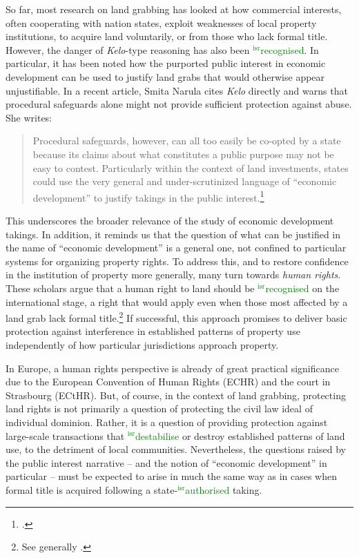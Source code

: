 \documentclass[12pt,a4paper]{book} %
\newcommand{\isr}[1]{\textcolor{green}{$^{\textrm{isr}}${#1}}}
\begin{document}
So far, most research on land grabbing has looked at how commercial interests, often cooperating with nation states, exploit weaknesses of local property institutions, to acquire land voluntarily, or from those who lack formal title. However, the danger of {\it Kelo}-type reasoning has also been \isr{recognised}. In particular, it has been noted how the purported public interest in economic development can be used to justify land grabs that would otherwise appear unjustifiable. In a recent article, Smita Narula cites {\it Kelo} directly and warns that procedural safeguards alone might not provide sufficient protection against abuse. She writes:
\begin{quote}
Procedural safeguards, however, can all too easily be co-opted by a state because its claims about what constitutes a public purpose may not be easy to contest. Particularly within the context of land investments, states could use the very general and under-scrutinized language of ``economic development'' to justify takings in the public interest.\footcite[157]{narula13}
\end{quote}

This underscores the broader relevance of the study of economic development takings. In addition, it reminds us that the question of what can be justified in the name of ``economic development'' is a general one, not confined to particular systems for organizing property rights. To address this, and to restore confidence in the institution of property more generally, many turn towards {\it human rights}. These scholars argue that a human right to land should be \isr{recognised} on the international stage, a right that would apply even when those most affected by a land grab lack formal title.\footnote{See generally \cite{schutter10,schutter11,kunnerman13}.} If successful, this approach promises to deliver basic protection against interference in established patterns of property use independently of how particular jurisdictions approach property.

In Europe, a human rights perspective is already of great practical significance due to the European Convention of Human Rights (ECHR) and the court in Strasbourg (ECtHR). But, of course, in the context of land grabbing, protecting land rights is not primarily a question of protecting the civil law ideal of individual dominion. Rather, it is a question of providing protection against large-scale transactions that \isr{destabilise} or destroy established patterns of land use, to the detriment of local communities. Nevertheless, the questions raised by the public interest  narrative -- and the notion of ``economic development'' in particular -- must be expected to arise in much the same way as in cases when formal title is acquired following a state-\isr{authorised} taking.
\end{document}
